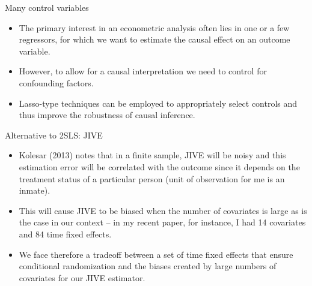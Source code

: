 \documentclass{beamer}
\begin{document}
\begin{frame}{Many control variables}

\begin{itemize}

\item The primary interest in an econometric analysis often lies in one or a few regressors, for which we want to estimate the causal effect on an outcome variable. 
\item However, to allow for a causal interpretation we need to control for confounding factors. 
\item Lasso-type techniques can be employed to appropriately select controls and thus improve the robustness of causal inference.

\end{itemize}

\end{frame}



\begin{frame}{Alternative to 2SLS: JIVE}

\begin{itemize}


\item Kolesar (2013) notes that in a finite sample, JIVE will be noisy and this estimation error will be correlated with the outcome since it depends on the treatment status of a particular person (unit of observation for me is an inmate).  

\item This will cause JIVE to be biased when the number of covariates is large as is the case in our context -- in my recent paper, for instance, I had 14 covariates and 84 time fixed effects. 

\item We face therefore a tradeoff between a set of time fixed effects that ensure conditional randomization and the biases created by large numbers of covariates for our JIVE estimator.  

\end{itemize}

\end{frame}
\end{document}
